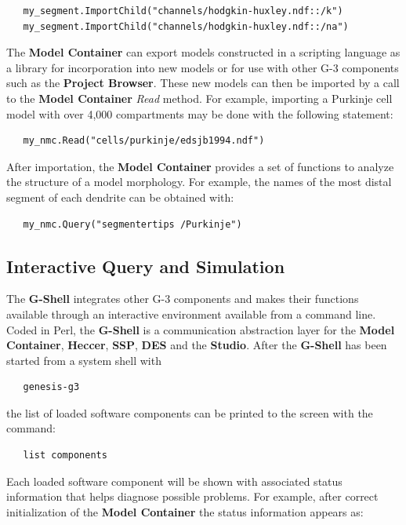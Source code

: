 \documentclass[10pt]{article}
\begin{document}
\begin{verbatim}
   my_segment.ImportChild("channels/hodgkin-huxley.ndf::/k")
   my_segment.ImportChild("channels/hodgkin-huxley.ndf::/na")
\end{verbatim}

The {\bf Model Container} can export models constructed in a
scripting language as a library for incorporation into new models or
for use with other G-3 components such as the {\bf Project Browser}.
These new models can then be imported by a call to the {\bf
  Model Container} {\it Read} method. For example, importing a
Purkinje cell model with over 4,000 compartments may be done with the
following statement:

\begin{verbatim}
   my_nmc.Read("cells/purkinje/edsjb1994.ndf")
\end{verbatim}

After importation, the {\bf Model Container} provides a set of
functions to analyze the structure of a model morphology.  For
example, the names of the most distal segment of each dendrite can be
obtained with:

\begin{verbatim}
   my_nmc.Query("segmentertips /Purkinje")
\end{verbatim}

\subsection*{Interactive Query and Simulation}

The {\bf G-Shell} integrates other
G-3 components and makes their functions available through an
interactive environment available from a command line.  Coded in Perl, the {\bf G-Shell} is a
communication abstraction layer for 
the {\bf Model Container}, {\bf Heccer}, {\bf SSP}, {\bf DES} and the {\bf
  Studio}.  After the {\bf G-Shell} has been started from a system
shell with
\begin{verbatim}
   genesis-g3
\end{verbatim}
the list of loaded software components can be printed to the screen with the command:

\begin{verbatim}
   list components
\end{verbatim}

Each loaded software component will be shown with associated status
information that helps diagnose possible problems.  For
example, after correct initialization of the {\bf Model Container} the
status information appears as:
\end{document}
